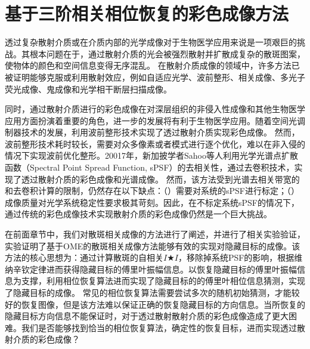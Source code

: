 
\chapter{基于三阶相关相位恢复的彩色成像方法}

透过复杂散射介质或在介质内部的光学成像对于生物医学应用来说是一项艰巨的挑战。其根本问题在于，通过散射介质的光会被强烈散射并扩散成复杂的散斑图案，使物体的颜色和空间信息变得无序混乱\cite{Freund1988,goodman_speckle_2007,bertolotti_non-invasive_2012,katz_non-invasive_2014,Yllmaz2019}。
在散射介质成像的领域中，许多方法已被证明能够克服或利用散射效应\cite{newman_imaging_2016,godara_adaptive_2010,katz_looking_2012,larson_water-soluble_2003,liu_imaging_2011,paniagua-diaz_blind_2019}，例如自适应光学\cite{godara_adaptive_2010}、波前整形\cite{katz_looking_2012}、相关成像\cite{bertolotti_non-invasive_2012,katz_non-invasive_2014}、多光子荧光成像\cite{liu_imaging_2011,larson_water-soluble_2003}、鬼成像\cite{paniagua-diaz_blind_2019}和光学相干断层扫描成像\cite{park_full-field_2014}。

同时，通过散射介质进行的彩色成像\cite{conkey_color_2012,leung_acousto-optic_2013,sahoo_single-shot_2017}在对深层组织的非侵入性成像和其他生物医学应用方面扮演着重要的角色，进一步的发展将有利于生物医学应用。随着空间光调制器技术的发展，利用波前整形技术实现了透过散射介质实现彩色成像\cite{leung_acousto-optic_2013,sahoo_single-shot_2017}。
然而，波前整形技术耗时较长，需要对众多像素或者模式进行逐个优化，难以在非入侵的情况下实现波前优化整形。20017年，新加披学者Sahoo等人\cite{sahoo_single-shot_2017}利用光学光谱点扩散函数（Spectral Point Spread Function, sPSF）\cite{Freund1988,goodman_speckle_2007}的去相关性，通过去卷积技术，实现了透过散射介质的彩色成像和光谱成像。
然而，该方法受到光谱去相关带宽的和去卷积计算的限制，仍然存在以下缺点：（）需要对系统的sPSF进行标定；（）成像质量对光学系统稳定性要求极其苛刻。因此，在不标定系统sPSF的情况下，通过传统的彩色成像技术实现散射介质的彩色成像仍然是一个巨大挑战。

在前面章节中，我们对散斑相关成像的方法进行了阐述，并进行了相关实验验证，实验证明了基于OME的散斑相关成像方法能够有效的实现对隐藏目标的成像。该方法的核心思想为：通过计算散斑的自相关$I \bigstar I$，移除掉系统PSF的影响，根据维纳辛钦定律进而获得隐藏目标的傅里叶振幅信息。以恢复隐藏目标的傅里叶振幅信息为支撑，利用相位恢复算法进而实现了隐藏目标的的傅里叶相位信息猜测，实现了隐藏目标的成像。
常见的相位恢复算法需要尝试多次的随机初始猜测，才能较好的恢复图像，但是该方法难以保证正确的恢复隐藏目标的方向信息。当所恢复的隐藏目标方向信息不能保证时，对于透过散射散射介质的彩色成像造成了更大困难。我们是否能够找到恰当的相位恢复算法，确定性的恢复目标，进而实现透过散射介质的彩色成像？

